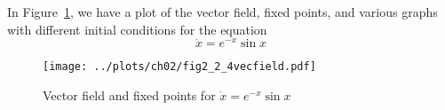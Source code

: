 
In Figure~\ref{fig2_2_4vecfield}, we have a plot of the vector field, fixed points,
and various graphs with different initial conditions for the equation 
\[
    \dot{x} = e^{-x}\sin{x}
\]
\begin{figure}[!ht]
    \texttt{[image: ../plots/ch02/fig2\_2\_4vecfield.pdf]}
    \caption{Vector field and fixed points for $\dot{x} = e^{-x}\sin{x}$
        \label{fig2_2_4vecfield}}
\end{figure}
